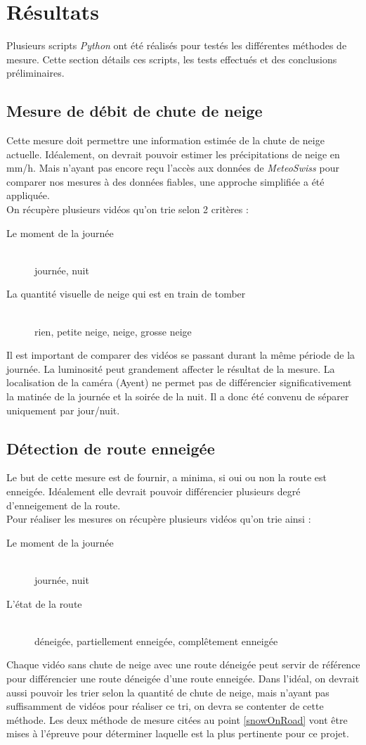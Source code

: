 \section{Résultats}
Plusieurs scripts \emph{Python} ont été réalisés pour testés les différentes
méthodes de mesure. Cette section détails ces scripts, les tests effectués
et des conclusions préliminaires.

\subsection{Mesure de débit de chute de neige} \label{snowfall}
Cette mesure doit permettre une information estimée de la chute de neige
actuelle. Idéalement, on devrait pouvoir estimer les précipitations de neige
en mm/h. Mais n'ayant pas encore reçu l'accès aux données de \emph{MeteoSwiss}
pour comparer nos mesures à des données fiables, une approche simplifiée a été
appliquée.\\
On récupère plusieurs vidéos qu'on trie selon 2 critères :
\begin{description}
    \item[Le moment de la journée] \hfill \\
    journée, nuit
    \item[La quantité visuelle de neige qui est en train de tomber] \hfill \\
    rien, petite neige, neige, grosse neige
\end{description}
Il est important de comparer des vidéos se passant durant la même période de la journée.
La luminosité peut grandement affecter le résultat de la mesure. La localisation
de la caméra (Ayent) ne permet pas de différencier significativement la matinée
de la journée et la soirée de la nuit. Il a donc été convenu de séparer uniquement
par jour/nuit.

\subsection{Détection de route enneigée}
Le but de cette mesure est de fournir, a minima, si oui ou non la route
est enneigée. Idéalement elle devrait pouvoir différencier plusieurs degré
d'enneigement de la route. \\
Pour réaliser les mesures on récupère plusieurs vidéos qu'on trie ainsi :
\begin{description}
    \item[Le moment de la journée] \hfill \\
    journée, nuit 
    \item[L'état de la route] \hfill \\
    déneigée, partiellement enneigée, complêtement enneigée 
\end{description}
Chaque vidéo sans chute de neige avec une route déneigée peut servir de 
référence pour différencier une route déneigée d'une route enneigée.
Dans l'idéal, on devrait aussi pouvoir les trier selon la quantité de chute
de neige, mais n'ayant pas suffisamment de vidéos pour réaliser ce tri, on devra
se contenter de cette méthode.
Les deux méthode de mesure citées au point \ref{snowOnRoad} vont être mises
à l'épreuve pour déterminer laquelle est la plus pertinente pour ce projet.